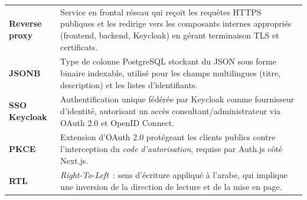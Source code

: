 \documentclass[12pt,a4paper]{report}
\begin{document}
\begin{longtable}{>{\bfseries}L{4.0cm} L{10.0cm}}
Reverse proxy & Service en frontal réseau qui reçoit les requêtes HTTPS publiques et les redirige vers les composants internes appropriés (frontend, backend, Keycloak) en gérant terminaison TLS et certificats. \\
JSONB & Type de colonne PostgreSQL stockant du JSON sous forme binaire indexable, utilisé pour les champs multilingues (titre, description) et les listes d'identifiants. \\
SSO Keycloak & Authentification unique fédérée par Keycloak comme fournisseur d'identité, autorisant un accès consultant/administrateur via OAuth 2.0 et OpenID Connect. \\
PKCE & Extension d'OAuth 2.0 protégeant les clients publics contre l'interception du \textit{code d'autorisation}, requise par Auth.js côté Next.js. \\
RTL & \textit{Right-To-Left}~: sens d'écriture appliqué à l'arabe, qui implique une inversion de la direction de lecture et de la mise en page. \\
\bottomrule
\end{longtable}
\end{document}
